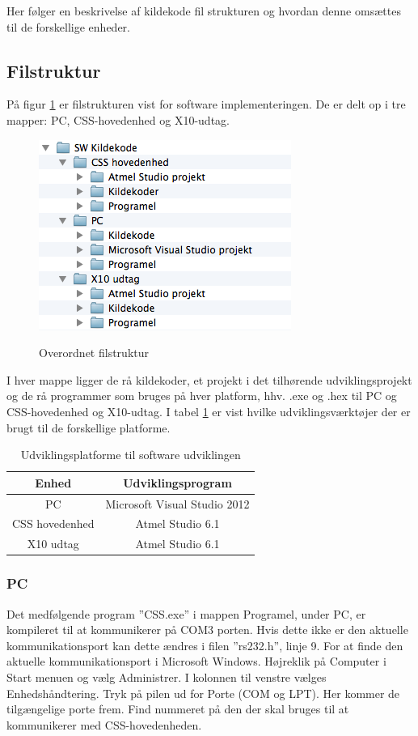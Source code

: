 Her følger en beskrivelse af kildekode fil strukturen og hvordan denne omsættes til de forskellige enheder.

\subsection{Filstruktur}
På figur \ref{fig:filstruktur1} er filstrukturen vist for software implementeringen.
De er delt op i tre mapper: PC, CSS-hovedenhed og X10-udtag.

\begin{figure}[!htb]
     \centering
     { \includegraphics{billeder/Filstruktur1}}
     \caption{Overordnet filstruktur}
     \label{fig:filstruktur1}
\end{figure}

I hver mappe ligger de rå kildekoder, et projekt i det tilhørende udviklingsprojekt og de rå programmer som bruges på hver platform, hhv. .exe og .hex til PC og CSS-hovedenhed og X10-udtag.
I tabel \ref{table:Udviklingsprogrammer} er vist hvilke udviklingsværktøjer der er brugt til de forskellige platforme.

\begin{table}[htb]
	\caption{Udviklingsplatforme til software udviklingen}
	\centering
	\begin{tabular}{|c|c|}
		\hline 
		\textbf{Enhed} & \textbf{Udviklingsprogram} \\ 
		\hline 
		PC & Microsoft Visual Studio 2012 \\ 
		\hline 
		CSS hovedenhed & Atmel Studio 6.1 \\ 
		\hline 
		X10 udtag & Atmel Studio 6.1 \\ 
		\hline 
	\end{tabular} 
	\label{table:Udviklingsprogrammer}
\end{table}

\subsubsection{PC}
Det medfølgende program ''CSS.exe'' i mappen Programel, under PC, er kompileret til at kommunikerer på COM3 porten. Hvis dette ikke er den aktuelle kommunikationsport kan dette ændres i filen ''rs232.h'', linje 9. For at finde den aktuelle kommunikationsport i Microsoft Windows. Højreklik på Computer i Start menuen og vælg Administrer. I kolonnen til venstre vælges Enhedshåndtering. Tryk på pilen ud for Porte (COM og LPT). Her kommer de tilgængelige porte frem. Find nummeret på den der skal bruges til at kommunikerer med CSS-hovedenheden.

